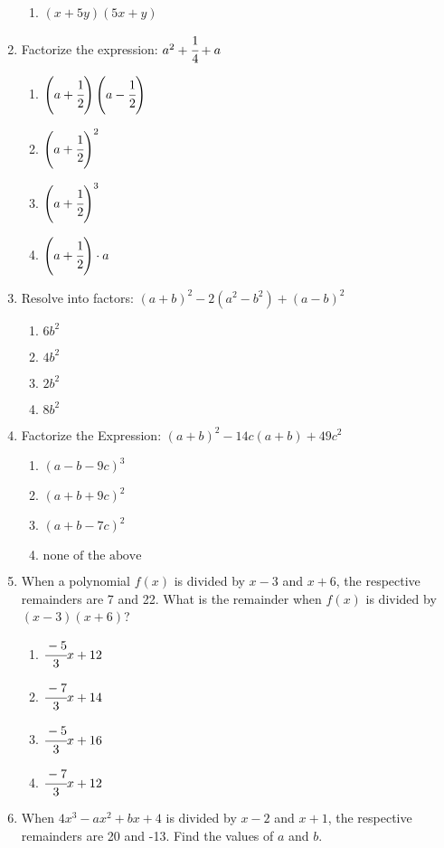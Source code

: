 \begin{multicols}{2}
\begin{enumerate}[label={\arabic*.}]
\begin{enumerate}[label={\Alph*.}]
	\item \((x+5y)(5x + y)\)
	\end{enumerate}
\item Factorize the expression: $a^2 + \cfrac{1}{4} + a$
\begin{multicols}{2}
	\begin{enumerate}[label={\Alph*.}]
	\item \(\left(a+ \cfrac{1}{2}\right) \left(a - \cfrac{1}{2}\right) \)
	\item \(\left(a+ \cfrac{1}{2}\right)^2\)
	\item \(\left(a+\cfrac{1}{2}\right)^3\)
	\item \(\left(a+ \cfrac{1}{2}\right)\cdot a\)
\end{enumerate}
\end{multicols}
\item Resolve into factors: $(a+b)^2 - 2(a^2 - b^2) + (a-b)^2$
	\begin{enumerate}[label={\Alph*.}]
	\item \(6b^2\)
	\item \(4b^2\)
	\item \(2b^2\)
	\item \(8b^2\)
	\end{enumerate}
\item Factorize the Expression: $(a+b)^2 - 14c(a+b) + 49c^2$
	\begin{enumerate}[label={\Alph*.}]
	\item \((a-b-9c)^3\)
	\item \((a+b+9c)^2\)
	\item \((a+b-7c)^2\)
	\item \(\text{none of the above}\)
	\end{enumerate}
\item When a polynomial $f(x)$ is divided by $x-3$ and $x+6$, the respective remainders are 7 and 22. What is the remainder when $f(x)$ is divided by $(x-3)(x+6)$?
	\begin{enumerate}[label={\Alph*.}]
	\item \(\cfrac{-5}{3}x + 12\)
	\item \(\cfrac{-7}{3}x + 14\)
	\item \(\cfrac{-5}{3}x + 16\)
	\item \(\cfrac{-7}{3}x + 12\)
	\end{enumerate}
\item When $4x^3 - ax^2 + bx + 4$ is divided by $x-2$ and $x+1$, the respective remainders are 20 and -13. Find the values of $a$ and $b$.
	\begin{enumerate}[label={\Alph*.}]

\end{enumerate}
\end{enumerate}
\end{multicols}
